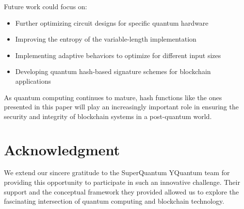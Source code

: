 \documentclass[conference]{IEEEtran}
\begin{document}
Future work could focus on:
\begin{itemize}
    \item Further optimizing circuit designs for specific quantum hardware
    \item Improving the entropy of the variable-length implementation
    \item Implementing adaptive behaviors to optimize for different input sizes
    \item Developing quantum hash-based signature schemes for blockchain applications
\end{itemize}

As quantum computing continues to mature, hash functions like the ones presented in this paper will play an increasingly important role in ensuring the security and integrity of blockchain systems in a post-quantum world.

\section*{Acknowledgment}
We extend our sincere gratitude to the SuperQuantum YQuantum team for providing this opportunity to participate in such an innovative challenge. Their support and the conceptual framework they provided allowed us to explore the fascinating intersection of quantum computing and blockchain technology.
\end{document}
